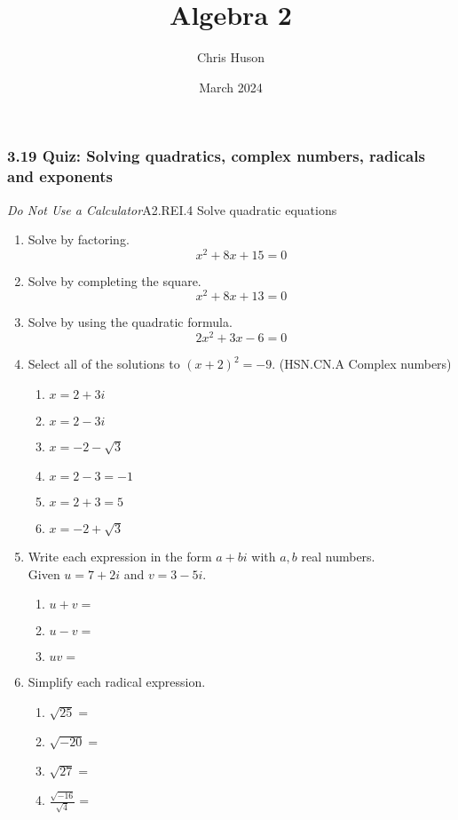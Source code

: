 \documentclass[12pt, twoside]{article}
\title{Algebra 2}
\author{Chris Huson}
\date{March 2024}
\begin{document}
\subsubsection*{3.19 Quiz: Solving quadratics, complex numbers, radicals and exponents}
\emph{Do Not Use a Calculator}\hfill A2.REI.4 Solve quadratic equations
\begin{enumerate}

\item Solve by factoring.
$$x^2 + 8x + 15 = 0$$ \vspace{3cm}

\item Solve by completing the square.
$$x^2 + 8x + 13 = 0$$ \vspace{6cm}

\item Solve by using the quadratic formula.
$$2x^2 + 3x - 6 = 0$$ \vspace{4cm}

\newpage 
\item Select all of the solutions to $(x+2)^2= -9$. \hfill (HSN.CN.A Complex numbers)
    \begin{multicols}{2}
    \begin{enumerate}
        \item $x= 2+3i$
        \item $x= 2-3i$
        \item $x= -2 - \sqrt{3}$
        \item $x= 2 -3 = -1$
        \item $x= 2+3 = 5$
        \item $x= -2 + \sqrt{3}$
    \end{enumerate}
    \end{multicols}

\item Write each expression in the form $a+bi$ with $a,b$ real numbers. \\[0.25cm]
    Given  $u = 7 + 2i $ and $v = 3- 5i$.
        \begin{enumerate}[itemsep=1.5cm]
            \item $u+v =$
            \item $u-v =$
            \item $uv =$
        \end{enumerate} \vspace{3cm}

\item Simplify each radical expression.
    \begin{multicols}{2}
    \begin{enumerate}[itemsep=0.5cm]
        \item $\sqrt{25}=$
        \item $\sqrt{-20}=$
        \item $\sqrt{27}=$
        \item $\displaystyle \frac{\sqrt{-16}}{\sqrt{4}}=$
    \end{enumerate}
    \end{multicols} \vspace{2cm}


\end{enumerate}
\end{document}
